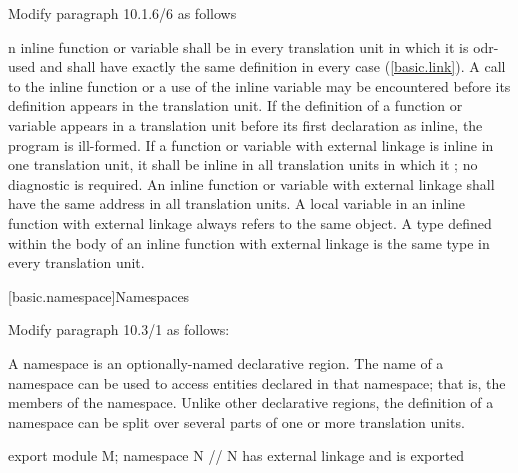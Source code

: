 \noindent
Modify paragraph 10.1.6/6 as follows
\begin{std.txt}
  \resetalinea[5]
  \alinea
  n inline function or variable shall be 
   in every translation 
  unit in which it is odr-used and  shall have exactly 
  the same definition in every case (\ref{basic.link}).
  \enternote
  A call to the inline function or a use of 
  the inline variable may be encountered before its definition appears 
  in the translation unit.
  \exitnote
  If the definition of a function or variable appears in a translation unit 
  before its first declaration as inline, the program is ill-formed. If a 
  function or variable with external  linkage is 
  inline  in one translation 
  unit, it shall be  inline
   in all translation units in which it 
  ; 
  no diagnostic is required. An inline function or variable with 
  external  linkage 
  shall have the same address in all translation units.
  \enternote
  A  local variable in an inline function with external 
   linkage always refers to the same object. A type 
  defined within the body 
  of an inline function with external  linkage is the 
  same type in every translation unit.
  \exitnote
\end{std.txt}




\setcounter{section}{2}
[basic.namespace]{Namespaces}%

\noindent
Modify paragraph 10.3/1 as follows:
\begin{std.txt}
  \resetalinea[0]
  \alinea
  A namespace is an optionally-named declarative region. The name of a
  namespace can be used to access entities declared in that namespace;
  that is, the members of the namespace. Unlike other declarative
  regions, the definition of a namespace can be split over several
  parts of one or more translation units.
  \color{addclr}
  \begin{example}
  \begin{codeblock}
    export module M;
    namespace N {    // N has external linkage and is exported
    }
  \end{codeblock}
  \end{example}
\end{std.txt}

